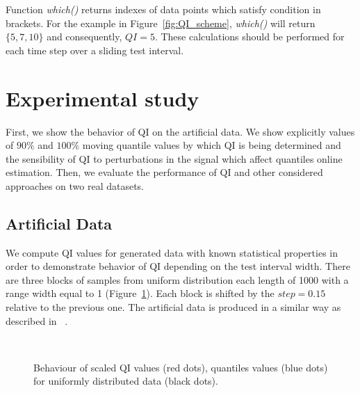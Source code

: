 Function \textit{which()} returns indexes of data points which satisfy condition in brackets. For the example in Figure~\ref{fig:QI_scheme}, \textit{which()} will return $\{5,7,10\}$ and consequently, $QI=5$.
These calculations should be performed for each time step over a sliding test interval.

\section{Experimental study}
\label{sec:experiments}
First, we show the behavior of QI on the artificial data. 
We show explicitly values of $90\%$ and $100\%$ moving quantile values by which QI is being determined and the sensibility of QI to perturbations in the signal which affect quantiles online estimation.
Then, we evaluate the performance of QI and other considered approaches on two real datasets.

\subsection{Artificial Data}
We compute QI values for generated data with known statistical properties in order to
demonstrate behavior of QI depending on the test interval width.
There are three blocks of samples from uniform distribution each length of 1000 with a range width equal to 1 (Figure~\ref{fig:figure3.0}).
Each block is shifted by the $step = 0.15$ relative to the previous one.
The artificial data is produced in a similar way as described in ~\cite{journals/tkde/TakeuchiY06,Kawahara_2009}.

\begin{figure}[htb!]
\\
\caption{Behaviour of scaled QI values (red dots), quantiles values (blue dots) for uniformly distributed data (black dots).}
\label{fig:figure3.0}
\end{figure}


